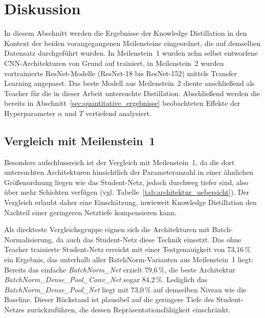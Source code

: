 \section{Diskussion}
\label{sec:diskussion}
 
In diesem Abschnitt werden die Ergebnisse der Knowledge Distillation in den Kontext der beiden vorangegangenen
Meilensteine eingeordnet, die auf demselben Datensatz durchgeführt wurden. In Meilenstein~1 \cite{steidlehenssler2026milestone1} wurden zehn selbst
entworfene CNN-Architekturen von Grund auf trainiert, in Meilenstein~2 wurden vortrainierte ResNet-Modelle
(ResNet-18 bis ResNet-152) mittels Transfer Learning angepasst. Das beste Modell aus Meilenstein~2 diente anschließend
als Teacher für die in dieser Arbeit untersuchte Distillation. Abschließend werden die bereits in
Abschnitt~\ref{sec:quantitative_ergebnisse} beobachteten Effekte der Hyperparameter $\alpha$ und $T$ vertiefend
analysiert.
 
\subsection{Vergleich mit Meilenstein~1}
\label{sec:diskussion_m1}
 
Besonders aufschlussreich ist der Vergleich mit Meilenstein~1, da die dort untersuchten Architekturen hinsichtlich der
Parameteranzahl in einer ähnlichen Größenordnung liegen wie das Student-Netz, jedoch durchweg tiefer sind, also über mehr
Schichten verfügen (vgl. Tabelle~\ref{tab:architektur_uebersicht}). Der Vergleich erlaubt daher eine Einschätzung,
inwieweit Knowledge Distillation den Nachteil einer geringeren Netztiefe kompensieren kann.
 
Als direkteste Vergleichsgruppe eignen sich die Architekturen mit Batch-Normalisierung, da auch das Student-Netz diese
Technik einsetzt. Das ohne Teacher trainierte Student-Netz erreicht mit einer Testgenauigkeit von 73{,}16\,\% ein
Ergebnis, das unterhalb aller BatchNorm-Varianten aus Meilenstein~1 liegt: Bereits das einfache \textit{BatchNorm\_Net}
erzielt 79{,}6\,\%, die beste Architektur \textit{BatchNorm\_Dense\_Pool\_Conv\_Net} sogar 84{,}2\,\%. Lediglich
das \textit{BatchNorm\_Dense\_Pool\_Net} liegt mit 73{,}0\,\% auf demselben Niveau wie die Baseline. Dieser Rückstand
ist plausibel auf die geringere Tiefe des Student-Netzes zurückzuführen, die dessen Repräsentationsfähigkeit einschränkt.
 
